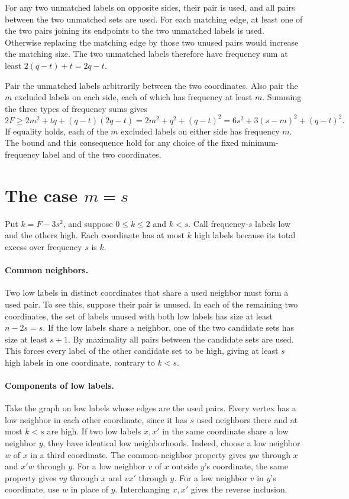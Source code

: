 \documentclass[11pt]{article}
\begin{document}
For any two unmatched labels on opposite sides, their pair is used,
and all pairs between the two unmatched sets are used. For each
matching edge, at least one of the two pairs joining its endpoints to
the two unmatched labels is used. Otherwise replacing the matching
edge by those two unused pairs would increase the matching size.
The two unmatched labels therefore have frequency sum at least
\(2(q-t)+t=2q-t\).

Pair the unmatched labels arbitrarily between the two coordinates.
Also pair the \(m\) excluded labels on each side, each of which has
frequency at least \(m\). Summing the three types of frequency sums
gives
\begin{equation}\label{eq:bound}
2F\ge 2m^2+tq+(q-t)(2q-t)
=2m^2+q^2+(q-t)^2
=6s^2+3(s-m)^2+(q-t)^2.
\end{equation}
If equality holds, each of the \(m\) excluded labels on either side
has frequency \(m\). The bound and this consequence hold for any
choice of the fixed minimum-frequency label and of the two
coordinates.

\section[Minimum frequency s]{The case \(m=s\)}

Put \(k=F-3s^2\), and suppose \(0\le k\le2\) and \(k<s\).
Call frequency-\(s\) labels low and the others high. Each coordinate
has at most \(k\) high labels because its total excess over frequency
\(s\) is \(k\).

\paragraph{Common neighbors.}
Two low labels in distinct coordinates that share a used neighbor
must form a used pair. To see this, suppose their pair is unused.
In each of the remaining two coordinates, the set of labels unused
with both low labels has size at least \(n-2s=s\). If the low labels
share a neighbor, one of the two candidate sets has size at least
\(s+1\). By maximality all pairs between the candidate sets are used.
This forces every label of the other candidate set to be high, giving
at least \(s\) high labels in one coordinate, contrary to \(k<s\).

\paragraph{Components of low labels.}
Take the graph on low labels whose edges are the used pairs. Every
vertex has a low neighbor in each other coordinate, since it has
\(s\) used neighbors there and at most \(k<s\) are high. If two low
labels \(x,x'\) in the same coordinate share a low neighbor \(y\),
they have identical low neighborhoods. Indeed, choose a low neighbor
\(w\) of \(x\) in a third coordinate. The common-neighbor property
gives \(yw\) through \(x\) and \(x'w\) through \(y\). For a low neighbor
\(v\) of \(x\) outside \(y\)'s coordinate, the same property gives
\(vy\) through \(x\) and \(vx'\) through \(y\). For a low neighbor
\(v\) in \(y\)'s coordinate, use \(w\) in place of \(y\).
Interchanging \(x,x'\) gives the reverse inclusion.
\end{document}
